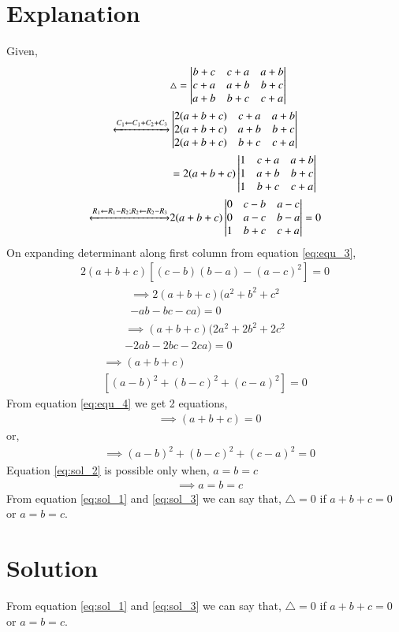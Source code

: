 \documentclass[journal,12pt,twocolumn]{IEEEtran}
\begin{document}
\section{Explanation}
Given,\\
\begin{align}
&\triangle = \begin{vmatrix}b+c & c+a & a+b\\c+a & a+b & b+c\\a+b&b+c & c+a\end{vmatrix} \label{eq:ques}\\
\xleftrightarrow[]{C_1\leftarrow C_1+C_2+C_3}
&\begin{vmatrix}2(a+b+c) & c+a & a+b\\2(a+b+c) & a+b & b+c\\2(a+b+c)&b+c & c+a\end{vmatrix} \label{eq:eq_1}\\
&=2(a+b+c)\begin{vmatrix}1 & c+a & a+b\\1 & a+b & b+c\\1&b+c & c+a\end{vmatrix} \label{eq:eq_2}\\
\xleftrightarrow[]{R_1\leftarrow R_1-R_2; R_2 \leftarrow R_2-R_3}
&2(a+b+c)\begin{vmatrix}0 & c-b & a-c\\0 & a-c & b-a\\1&b+c & c+a\end{vmatrix} =0 \label{eq:equ_3}
\end{align}
On expanding determinant along first column from equation \eqref{eq:equ_3},
\begin{multline}
2(a+b+c)[(c-b)(b-a)-(a-c)^{2}]=0 \nonumber
\end{multline}
\begin{multline}
\implies 2(a+b+c)(a^{2}+b^{2}+c^{2}\\
-ab-bc-ca)=0 \nonumber
\end{multline}
\begin{multline}
\implies (a+b+c)(2a^{2}+2b^{2}+2c^{2}\\
-2ab-2bc-2ca)=0\nonumber
\end{multline}
\begin{multline}
\implies (a+b+c)\\
[(a-b)^{2}+(b-c)^{2}+(c-a)^{2}] = 0 \label{eq:equ_4}
\end{multline}
From equation \eqref{eq:equ_4} we get 2 equations,
\begin{align}
&\implies \boxed{(a+b+c) = 0} \label{eq:sol_1}
\end{align}
or,
\begin{align}
&\implies (a-b)^{2}+(b-c)^{2}+(c-a)^{2} = 0 \label{eq:sol_2}
\end{align}
Equation \eqref{eq:sol_2} is possible only when, $a=b=c$
\begin{align}
&\implies \boxed{a=b=c} \label{eq:sol_3}
\end{align}
From equation \eqref{eq:sol_1} and \eqref{eq:sol_3} we can say that,
$\triangle=0$ if $a+b+c=0$ or $a=b=c$.
\section{Solution}

From equation \eqref{eq:sol_1} and \eqref{eq:sol_3} we can say that,
$\triangle=0$ if $a+b+c=0$ or $a=b=c$.

\\
\end{document}
